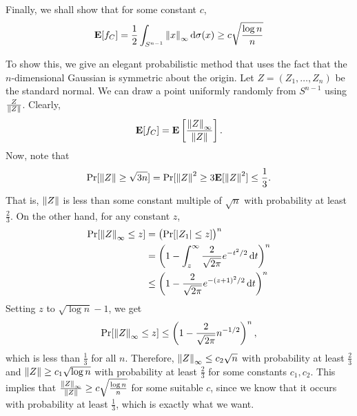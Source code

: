 Finally, we shall show that for some constant $c$,
\[ \textbf{E}[f_C] = \frac{1}{2} \int_{S^{n-1}} \left\lVert x\right\rVert_\infty \operatorname{d}\!{\sigma}(x) \geq c\sqrt\frac{\log n}{n} \]

To show this, we give an elegant probabilistic method that uses the fact that the $n$-dimensional Gaussian is symmetric about the origin. Let $Z=(Z_1,\ldots,Z_n)$ be the standard normal. We can draw a point uniformly randomly from $S^{n-1}$ using $\frac{Z}{\left\lVert Z\right\rVert}$. Clearly,
\[ \textbf{E}[f_C] = \textbf{E}\left[\frac{\left\lVert Z\right\rVert_\infty}{\left\lVert Z\right\rVert}\right]. \]
Now, note that
\[ \Pr[\left\lVert Z\right\rVert \geq \sqrt{3n}] = \Pr[\left\lVert Z\right\rVert^2 \geq 3\textbf{E}[\left\lVert Z\right\rVert^2] \leq \frac{1}{3}. \]
That is, $\left\lVert Z\right\rVert$ is less than some constant multiple of $\sqrt{n}$ with probability at least $\frac{2}{3}$. On the other hand, for any constant $z$,
\begin{align*}
    \Pr[\left\lVert Z\right\rVert_\infty \leq z] &= \left(\Pr[|Z_1| \leq z]\right)^n \\
    &= \left(1 - \int_z^\infty \frac{2}{\sqrt{2\pi}}e^{-t^2/2}\operatorname{d}\!{t} \right)^n \\
    &\leq \left(1 - \frac{2}{\sqrt{2\pi}} e^{-(z+1)^2/2}\operatorname{d}\!{t} \right)^n \\
\end{align*}
Setting $z$ to $\sqrt{\log n}-1$, we get
\[ \Pr[\left\lVert Z\right\rVert_\infty \leq z] \leq \left(1-\frac{2}{\sqrt{2\pi}} n^{-1/2} \right)^n,\]
which is less than $\frac{1}{3}$ for all $n$. Therefore, $\left\lVert Z\right\rVert_\infty \leq c_2\sqrt{n}$ with probability at least $\frac{2}{3}$ and $\left\lVert Z\right\rVert \geq c_1 \sqrt{\log n}$ with probability at least $\frac{2}{3}$ for some constants $c_1,c_2$. This implies that $\frac{\left\lVert Z\right\rVert_\infty}{\left\lVert Z\right\rVert} \geq c\sqrt\frac{\log n}{n}$ for some suitable $c$, since we know that it occurs with probability at least $\frac{1}{3}$, which is exactly what we want.
